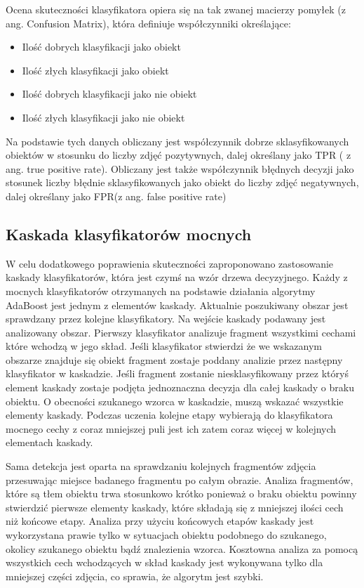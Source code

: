 Ocena skuteczności klasyfikatora opiera się na tak zwanej macierzy pomyłek (z ang. Confusion Matrix), która definiuje współczynniki określające:
\begin{itemize}
    \item Ilość dobrych klasyfikacji jako obiekt
    \item Ilość złych klasyfikacji jako obiekt
    \item Ilość dobrych klasyfikacji jako nie obiekt
    \item Ilość złych klasyfikacji jako nie obiekt
\end{itemize}

Na podstawie tych danych obliczany jest współczynnik dobrze sklasyfikowanych obiektów w stosunku do liczby zdjęć pozytywnych, dalej określany jako TPR ( z ang. true positive rate). Obliczany jest także współczynnik błędnych decyzji jako stosunek liczby błędnie sklasyfikowanych jako obiekt do liczby zdjęć negatywnych, dalej określany jako FPR(z ang. false positive rate)

\subsection{Kaskada klasyfikatorów mocnych}
W celu dodatkowego poprawienia skuteczności zaproponowano zastosowanie kaskady klasyfikatorów, która jest czymś na wzór drzewa decyzyjnego. Każdy z mocnych klasyfikatorów otrzymanych na podstawie działania algorytmy AdaBoost jest jednym z elementów kaskady. Aktualnie poszukiwany obszar jest sprawdzany przez kolejne klasyfikatory. Na wejście kaskady podawany jest analizowany obszar. Pierwszy klasyfikator analizuje fragment wszystkimi cechami które wchodzą w jego skład. Jeśli klasyfikator stwierdzi że we wskazanym obszarze znajduje się obiekt fragment zostaje poddany analizie przez następny klasyfikator w kaskadzie. Jeśli fragment zostanie niesklasyfikowany przez któryś element kaskady zostaje podjęta jednoznaczna decyzja dla całej kaskady o braku obiektu. O obecności szukanego wzorca w kaskadzie, muszą wskazać wszystkie elementy kaskady. Podczas uczenia kolejne etapy wybierają do klasyfikatora mocnego cechy z coraz mniejszej puli jest ich zatem coraz więcej w kolejnych elementach kaskady. 
	
Sama detekcja jest oparta na sprawdzaniu kolejnych fragmentów zdjęcia przesuwając miejsce badanego fragmentu po całym obrazie. Analiza fragmentów, które są tłem obiektu trwa stosunkowo krótko ponieważ o braku obiektu powinny stwierdzić pierwsze elementy kaskady, które składają się z mniejszej ilości cech niż końcowe etapy. Analiza przy użyciu końcowych etapów kaskady jest wykorzystana prawie tylko w sytuacjach obiektu podobnego do szukanego, okolicy szukanego obiektu bądź znalezienia wzorca.
Kosztowna analiza za pomocą wszystkich cech wchodzących w skład kaskady jest wykonywana tylko dla mniejszej części zdjęcia, co sprawia, że algorytm jest szybki.
